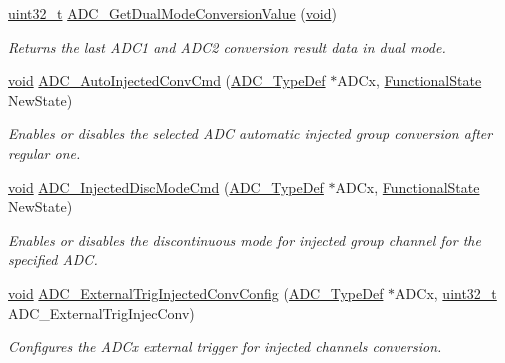 \begin{DoxyCompactItemize}
\hyperlink{_p_e___types_8h_a33594304e786b158f3fb30289278f5af}{uint32\+\_\+t} \hyperlink{group___a_d_c___exported___functions_gac5a4792dc29ef7ff6bfbce9f37e8a668}{A\+D\+C\+\_\+\+Get\+Dual\+Mode\+Conversion\+Value} (\hyperlink{usb__devapi_8h_afabf60e7f57651d6d595a02c75f07cd0}{void})
\begin{DoxyCompactList}\small\item\em Returns the last A\+D\+C1 and A\+D\+C2 conversion result data in dual mode. \end{DoxyCompactList}\item 
\hyperlink{usb__devapi_8h_afabf60e7f57651d6d595a02c75f07cd0}{void} \hyperlink{group___a_d_c___exported___functions_ga1ff9c3b8e4bbdd2addfd227f1a506a66}{A\+D\+C\+\_\+\+Auto\+Injected\+Conv\+Cmd} (\hyperlink{struct_a_d_c___type_def}{A\+D\+C\+\_\+\+Type\+Def} $\ast$A\+D\+Cx, \hyperlink{agilefox_2library_2inc_2stm32f10x__type_8h_ac9a7e9a35d2513ec15c3b537aaa4fba1}{Functional\+State} New\+State)
\begin{DoxyCompactList}\small\item\em Enables or disables the selected A\+DC automatic injected group conversion after regular one. \end{DoxyCompactList}\item 
\hyperlink{usb__devapi_8h_afabf60e7f57651d6d595a02c75f07cd0}{void} \hyperlink{group___a_d_c___exported___functions_ga0b583b94183fa4ff287177b9ee808092}{A\+D\+C\+\_\+\+Injected\+Disc\+Mode\+Cmd} (\hyperlink{struct_a_d_c___type_def}{A\+D\+C\+\_\+\+Type\+Def} $\ast$A\+D\+Cx, \hyperlink{agilefox_2library_2inc_2stm32f10x__type_8h_ac9a7e9a35d2513ec15c3b537aaa4fba1}{Functional\+State} New\+State)
\begin{DoxyCompactList}\small\item\em Enables or disables the discontinuous mode for injected group channel for the specified A\+DC. \end{DoxyCompactList}\item 
\hyperlink{usb__devapi_8h_afabf60e7f57651d6d595a02c75f07cd0}{void} \hyperlink{group___a_d_c___exported___functions_gafc02ce1e84e96b692adf085f61a0bca6}{A\+D\+C\+\_\+\+External\+Trig\+Injected\+Conv\+Config} (\hyperlink{struct_a_d_c___type_def}{A\+D\+C\+\_\+\+Type\+Def} $\ast$A\+D\+Cx, \hyperlink{_p_e___types_8h_a33594304e786b158f3fb30289278f5af}{uint32\+\_\+t} A\+D\+C\+\_\+\+External\+Trig\+Injec\+Conv)
\begin{DoxyCompactList}\small\item\em Configures the A\+D\+Cx external trigger for injected channels conversion. \end{DoxyCompactList}\item 

\end{DoxyCompactItemize}
